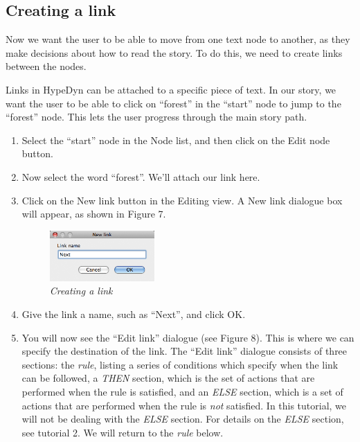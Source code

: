\documentclass{article}
\begin{document}
\subsection{Creating a link}

Now we want the user to be able to move from one text node to another, as they
make decisions about how to read the story. To do this, we need to create links
between the nodes.

Links in HypeDyn can be attached to a specific piece of text. In our story, we
want the user to be able to click on ``forest'' in the ``start'' node to jump
to the ``forest'' node. This lets the user progress through the main story path.

\begin{enumerate}
  \item Select the ``start'' node in the Node list, and then click on the Edit
  node button.
  \item Now select the word ``forest''. We'll attach our link here.
  \item Click on the New link button in the Editing view. A New link dialogue
  box will appear, as shown in Figure 7. 

 
\begin{figure}[ht]
  \centering
  \includegraphics[width=4cm]{images/hypedyn-tutorial-1-figure-7}
  \caption{\textit{Creating a link}}
\end{figure} 

\item Give the link a name, such as ``Next'', and click OK.
\item You will now see the ``Edit link'' dialogue (see Figure 8). This is where
we can specify the destination of the link. The ``Edit link'' dialogue consists
of three sections: the \textit{rule}, listing a series of conditions which
specify when the link can be followed, a \textit{THEN} section, which is the set of
actions that are performed when the rule is satisfied, and an \textit{ELSE} section,
which is a set of actions that are performed when the rule is \textit{not}
satisfied. In this tutorial, we will not be dealing with the \textit{ELSE}
section. For details on the \textit{ELSE} section, see tutorial 2. We will
return to the \textit{rule} below.


\end{enumerate}
\end{document}
